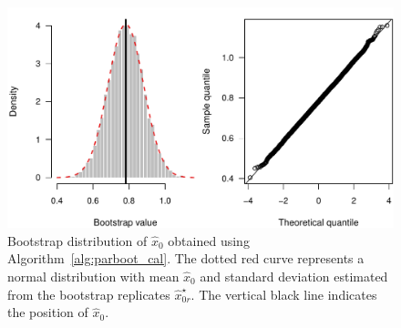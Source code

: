 \documentclass[cmfont,usenames,dvipsnames,leqno]{afit-etd}\usepackage[]{graphicx}\usepackage[]{color}
\makeatletter
\def\maxwidth{ %
  \ifdim\Gin@nat@width>\linewidth
    \linewidth
  \else
    \Gin@nat@width
  \fi
}
\newenvironment{knitrout}{}{} %
\renewenvironment{knitrout}{\begin{singlespace}}{\end{singlespace}}
\newcommand{\boot}{\star} %
\newcommand{\wh}[1]{\ensuremath{\widehat{#1}}}
\makeatother
\begin{document}
\begin{knitrout}
\color{fgcolor}\begin{figure}[H]

\includegraphics[width=\maxwidth]{figure/simdata-parboot-hist} \caption[Bootstrap distribution of $\wh{x}_0$ for the simulated random intercept data]{Bootstrap distribution of $\wh{x}_0$ obtained using Algorithm~\ref{alg:parboot_cal}. The dotted red curve represents a normal distribution  with mean $\wh{x}_0$ and standard deviation estimated from the bootstrap replicates $\wh{x}_{0r}^\boot$. The vertical black line indicates the position of $\wh{x}_0$.\label{fig:simdata-parboot-hist}}
\end{figure}


\end{knitrout}


\end{document}
